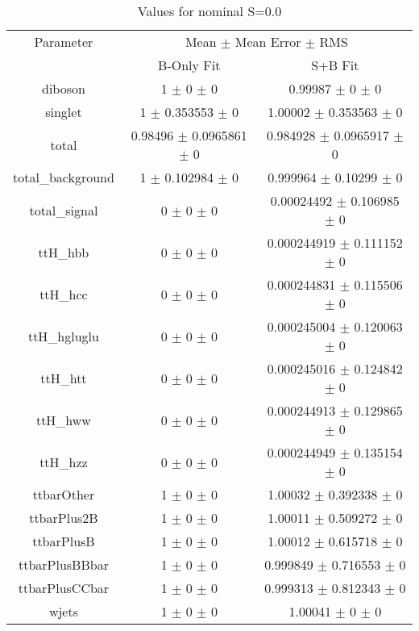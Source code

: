 \begin{table}
\centering
\caption{Values for nominal S=0.0}
\begin{tabular}{ccc}
\toprule
Parameter & \multicolumn{2}{c}{Mean $\pm$ Mean Error $\pm$ RMS}\\
 & B-Only Fit & S+B Fit\\
\midrule
diboson & \num{1} $\pm$ \num{0} $\pm$ \num{0} & \num{0.99987} $\pm$ \num{0} $\pm$ \num{0}\\
singlet & \num{1} $\pm$ \num{0.353553} $\pm$ \num{0} & \num{1.00002} $\pm$ \num{0.353563} $\pm$ \num{0}\\
total & \num{0.98496} $\pm$ \num{0.0965861} $\pm$ \num{0} & \num{0.984928} $\pm$ \num{0.0965917} $\pm$ \num{0}\\
total\_background & \num{1} $\pm$ \num{0.102984} $\pm$ \num{0} & \num{0.999964} $\pm$ \num{0.10299} $\pm$ \num{0}\\
total\_signal & \num{0} $\pm$ \num{0} $\pm$ \num{0} & \num{0.00024492} $\pm$ \num{0.106985} $\pm$ \num{0}\\
ttH\_hbb & \num{0} $\pm$ \num{0} $\pm$ \num{0} & \num{0.000244919} $\pm$ \num{0.111152} $\pm$ \num{0}\\
ttH\_hcc & \num{0} $\pm$ \num{0} $\pm$ \num{0} & \num{0.000244831} $\pm$ \num{0.115506} $\pm$ \num{0}\\
ttH\_hgluglu & \num{0} $\pm$ \num{0} $\pm$ \num{0} & \num{0.000245004} $\pm$ \num{0.120063} $\pm$ \num{0}\\
ttH\_htt & \num{0} $\pm$ \num{0} $\pm$ \num{0} & \num{0.000245016} $\pm$ \num{0.124842} $\pm$ \num{0}\\
ttH\_hww & \num{0} $\pm$ \num{0} $\pm$ \num{0} & \num{0.000244913} $\pm$ \num{0.129865} $\pm$ \num{0}\\
ttH\_hzz & \num{0} $\pm$ \num{0} $\pm$ \num{0} & \num{0.000244949} $\pm$ \num{0.135154} $\pm$ \num{0}\\
ttbarOther & \num{1} $\pm$ \num{0} $\pm$ \num{0} & \num{1.00032} $\pm$ \num{0.392338} $\pm$ \num{0}\\
ttbarPlus2B & \num{1} $\pm$ \num{0} $\pm$ \num{0} & \num{1.00011} $\pm$ \num{0.509272} $\pm$ \num{0}\\
ttbarPlusB & \num{1} $\pm$ \num{0} $\pm$ \num{0} & \num{1.00012} $\pm$ \num{0.615718} $\pm$ \num{0}\\
ttbarPlusBBbar & \num{1} $\pm$ \num{0} $\pm$ \num{0} & \num{0.999849} $\pm$ \num{0.716553} $\pm$ \num{0}\\
ttbarPlusCCbar & \num{1} $\pm$ \num{0} $\pm$ \num{0} & \num{0.999313} $\pm$ \num{0.812343} $\pm$ \num{0}\\
wjets & \num{1} $\pm$ \num{0} $\pm$ \num{0} & \num{1.00041} $\pm$ \num{0} $\pm$ \num{0}\\
\bottomrule
\end{tabular}
\end{table}